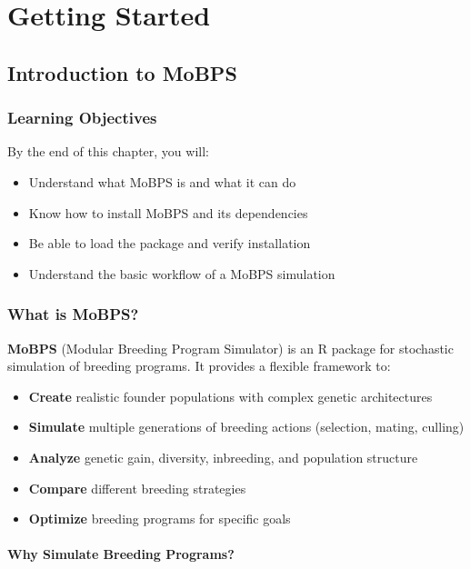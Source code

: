 \documentclass[
  letterpaper,
]{book}
\providecommand{\tightlist}{%
  \setlength{\itemsep}{0pt}\setlength{\parskip}{0pt}}
\begin{document}
\part{Getting Started}

\chapter{Introduction to MoBPS}\label{sec-introduction}

\section{Learning Objectives}\label{learning-objectives}

By the end of this chapter, you will:

\begin{itemize}
\tightlist
\item
  Understand what MoBPS is and what it can do
\item
  Know how to install MoBPS and its dependencies
\item
  Be able to load the package and verify installation
\item
  Understand the basic workflow of a MoBPS simulation
\end{itemize}

\section{What is MoBPS?}\label{what-is-mobps-1}

\textbf{MoBPS} (Modular Breeding Program Simulator) is an R package for
stochastic simulation of breeding programs. It provides a flexible
framework to:

\begin{itemize}
\tightlist
\item
  \textbf{Create} realistic founder populations with complex genetic
  architectures
\item
  \textbf{Simulate} multiple generations of breeding actions (selection,
  mating, culling)
\item
  \textbf{Analyze} genetic gain, diversity, inbreeding, and population
  structure
\item
  \textbf{Compare} different breeding strategies
\item
  \textbf{Optimize} breeding programs for specific goals
\end{itemize}

\subsection{Why Simulate Breeding
Programs?}\label{why-simulate-breeding-programs}
\end{document}
